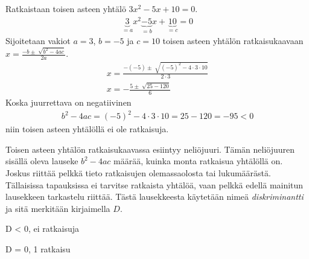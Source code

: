 \begin{esimerkki}
    Ratkaistaan toisen asteen yhtälö $3x^2-5x+10=0$.
    \begin{align*}
        \underbrace{3}_{=a}x^2\underbrace{-5}_{=b}x+\underbrace{10}_{=c}=0
    \end{align*}
    Sijoitetaan vakiot $a=3$, $b=-5$ ja $c=10$ toisen asteen yhtälön ratkaisukaavaan $x=\frac{-b \pm \sqrt[]{b^2-4ac}}{2a}$.
    \begin{align*}
        x=\frac{-(-5) \pm \sqrt[]{(-5)^2-4\cdot 3 \cdot 10}}{2 \cdot 3} \\
        x=-\frac{5 \pm \sqrt[]{25-120}}{6}
    \end{align*}
    Koska juurrettava on negatiivinen
    \begin{align*}
        b^2-4ac=(-5)^2-4 \cdot 3 \cdot 10=25-120=-95<0
    \end{align*}
    niin toisen asteen yhtälöllä ei ole ratkaisuja.
\end{esimerkki}


Toisen asteen yhtälön ratkaisukaavassa esiintyy neliöjuuri. Tämän neliöjuuren sisällä oleva lauseke $b^2-4ac$ määrää, kuinka monta ratkaisua yhtälöllä on. Joskus riittää pelkkä tieto ratkaisujen olemassaolosta tai lukumäärästä. Tällaisissa tapauksissa ei tarvitse ratkaista yhtälöä, vaan pelkkä edellä mainitun lausekkeen tarkastelu riittää. Tästä lausekkeesta käytetään nimeä \emph{diskriminantti} ja sitä merkitään kirjaimella $D$.


D < 0, ei ratkaisuja
\begin{kuvaajapohja}{1}{-1}{3}{-1}{3}
\end{kuvaajapohja}

D = 0, 1 ratkaisu
\begin{kuvaajapohja}{1}{-1}{3}{-1}{3}
\end{kuvaajapohja}

